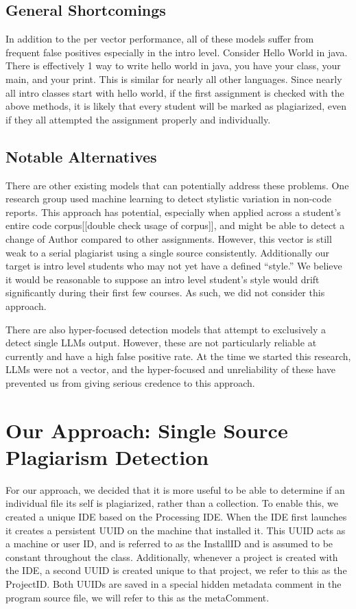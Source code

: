 \documentclass[conference]{IEEEtran}
\newcommand{\n}{\hfill\break}
\newcommand{\installID}{InstallID\xspace}
\newcommand{\projectID}{ProjectID\xspace}
\newcommand{\metaComment}{metaComment\xspace}
\begin{document}
\subsection*{\textbf{General Shortcomings}}
In addition to the per vector performance, all of these models suffer from frequent false positives especially in the intro level.  Consider Hello World in java.  There is effectively 1 way to write hello world in java, you have your class, your main, and your print.  This is similar for nearly all other languages.  Since nearly all intro classes start with hello world, if the first assignment is checked with the above methods, it is likely that every student will be marked as plagiarized, even if they all attempted the assignment properly and individually.

\subsection*{\textbf{Notable Alternatives}}
There are other existing models that can potentially address these problems.  One research group used machine learning to detect stylistic variation in non-code reports. \cite{english}  This approach has potential, especially when applied across a student's entire code corpus[[double check usage of corpus]], and might be able to detect a change of Author compared to other assignments.  However, this vector is still weak to a serial plagiarist using a single source consistently.  Additionally our target is intro level students who may not yet have a defined ``style.''  We believe it would be reasonable to suppose an intro level student's style would drift significantly during their first few courses.  As such, we did not consider this approach.

There are also hyper-focused detection models that attempt to exclusively a detect single LLMs output.\cite{llm detect}  However, these are not particularly reliable at currently\cite{23 percent} and have a high false positive rate. \cite{and you fail}  At the time we started this research, LLMs were not a vector, and the hyper-focused and unreliability of these have prevented us from giving serious credence to this approach. 
\n\section{\textbf{Our Approach:} Single Source Plagiarism Detection}
For our approach, we decided that it is more useful to be able to determine if an individual file its self is plagiarized, rather than a collection.  To enable this, we created a unique IDE based on the Processing IDE.  When the IDE first launches it creates a persistent UUID on the machine that installed it.  This UUID acts as a machine or user ID, and is referred to as the \installID and is assumed to be constant throughout the class.  Additionally, whenever a project is created with the IDE, a second UUID is created unique to that project, we refer to this as the \projectID.  Both UUIDs are saved in a special hidden metadata comment in the program source file, we will refer to this as the \metaComment.
\end{document}

